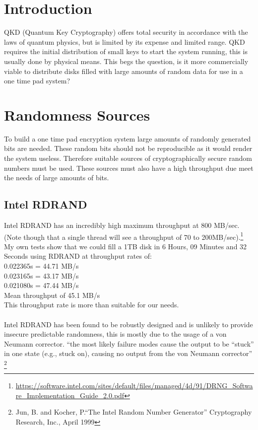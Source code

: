 \documentclass{paper}
\begin{document}
	\maketitle
	\section{Introduction}
		QKD (Quantum Key Cryptography) offers total security in accordance with the laws of quantum physics, but is limited by its expense and limited range. QKD requires the initial distribution of small keys to start the system running, this is usually done by physical means. This begs the question, is it more commercially viable to distribute disks filled with large amounts of random data for use in a one time pad system? \\
		
	
	\section{Randomness Sources}
		To build a one time pad encryption system large amounts of randomly generated bits are needed. These random bits should not be reproducible as it would render the system useless. Therefore suitable sources of cryptographically secure random numbers must be used. These sources must also have a high throughput due meet the needs of large amounts of bits.\\ 
	
		\subsection{Intel RDRAND}
			Intel RDRAND has an incredibly high maximum throughput at 800 MB/sec. (Note though that a single thread will see a throughput of 70 to 200MB/sec).\footnote{\url{https://software.intel.com/sites/default/files/managed/4d/91/DRNG_Software_Implementation_Guide_2.0.pdf}} \\
			My own tests show that we could fill a 1TB disk in 6 Hours, 09 Minutes and 32 Seconds using RDRAND at throughput rates of:\\
			0.022365s = 44.71 MB/s\\
			0.023165s = 43.17 MB/s\\
			0.021080s = 47.44 MB/s\\
			Mean throughput of 45.1 MB/s\\
			This throughput rate is more than suitable for our needs.\\\\
			Intel RDRAND has been found to be robustly designed and is unlikely to provide insecure predictable randomness, this is mostly due to the usage of a von Neumann corrector. ``the most likely failure modes cause the output to be “stuck” in one state (e.g., stuck on), causing no output from the von Neumann corrector'' \footnote{Jun, B. and Kocher, P.``The Intel Random Number Generator'' Cryptography Research, Inc., April 1999}
\end{document}
